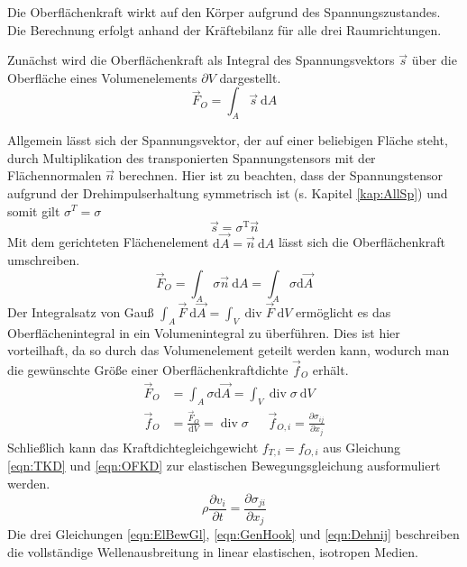 \documentclass[pdftex,a4paper,parskip,listof=totoc,bibliography=totoc,onehalfspacing,12pt]{scrreprt}
\begin{document}
Die Oberflächenkraft wirkt auf den Körper aufgrund des Spannungszustandes. Die Berechnung erfolgt anhand der Kräftebilanz für alle drei Raumrichtungen.

Zunächst wird die Oberflächenkraft als Integral des Spannungsvektors $\vec{s}$ über die Oberfläche eines Volumenelements $\partial V$ dargestellt.
\begin{equation}
	\vec{F}_O = \int_A \vec{s} ~\mathrm{d}A
\end{equation}

Allgemein lässt sich der Spannungsvektor, der auf einer beliebigen Fläche steht, durch Multiplikation des transponierten Spannungstensors mit der Flächennormalen $\vec{n}$ berechnen. Hier ist zu beachten, dass der Spannungstensor aufgrund der Drehimpulserhaltung symmetrisch ist (s. Kapitel \ref{kap:AllSp}) und somit gilt $\sigma^T = \sigma$
\begin{equation}
	\vec{s} = \sigma^\mathrm{T} \vec{n}
\end{equation}
Mit dem gerichteten Flächenelement $\mathrm{d}\vec{A} = \vec{n} ~\mathrm{d}A$ lässt sich die Oberflächenkraft umschreiben.
\begin{equation}
	\vec{F}_O = \int_A \sigma \vec{n} ~\mathrm{d}A = \int_A \sigma \mathrm{d}\vec{A} 
\end{equation}
Der Integralsatz von Gauß $\int_A \vec{F}~\mathrm{d}\vec{A} = \int_V \operatorname{div} \vec{F} ~\mathrm{d}V$ ermöglicht es das Oberflächenintegral in ein Volumenintegral zu überführen. Dies ist hier vorteilhaft, da so durch das Volumenelement geteilt werden kann, wodurch man die gewünschte Größe einer Oberflächenkraftdichte $\vec{f}_{O}$ erhält.
\begin{align}
	\vec{F}_O &= \int_A \sigma \mathrm{d}\vec{A} = \int_V \operatorname{div} \sigma ~\mathrm{d}V\\
	\vec{f}_O &= \frac{\vec{F}_O}{\mathrm{d}V} = \operatorname{div} \sigma~~~~~~~\vec{f}_{O,i} = \frac{\partial \sigma_{ij}}{\partial x_j}\label{eqn:OFKD}
\end{align}
Schließlich kann das Kraftdichtegleichgewicht $f_{T,i} = f_{O,i}$ aus Gleichung \ref{eqn:TKD} und \ref{eqn:OFKD} zur elastischen Bewegungsgleichung ausformuliert werden.
\begin{equation}
	\rho \frac{\partial v_i}{\partial t} =  \frac{\partial \sigma_{ji}}{\partial x_j}\label{eqn:ElBewGl}
\end{equation}
Die drei Gleichungen \ref{eqn:ElBewGl}, \ref{eqn:GenHook} und \ref{eqn:Dehnij} beschreiben die vollständige Wellenausbreitung in linear elastischen, isotropen Medien.
\end{document}
